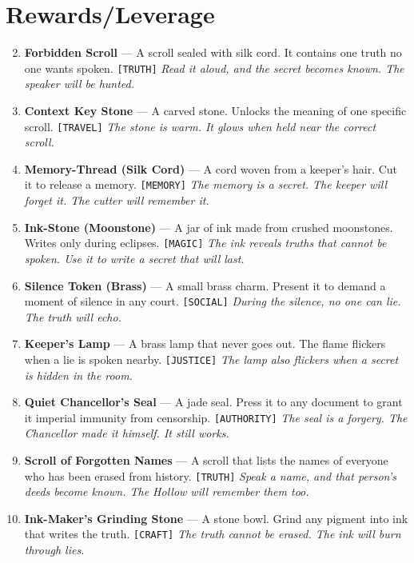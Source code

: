 \section*{ Rewards/Leverage}
\label{sec:lethai-thora-rewards}
\begin{enumerate}
\setcounter{enumi}{1}
\item \textbf{Forbidden Scroll} --- A scroll sealed with silk cord. It contains one truth no one wants spoken. \texttt{[TRUTH]}
  \hfill \textit{Read it aloud, and the secret becomes known. The speaker will be hunted.}
\item \textbf{Context Key Stone} --- A carved stone. Unlocks the meaning of one specific scroll. \texttt{[TRAVEL]}
  \hfill \textit{The stone is warm. It glows when held near the correct scroll.}
\item \textbf{Memory-Thread (Silk Cord)} --- A cord woven from a keeper's hair. Cut it to release a memory. \texttt{[MEMORY]}
  \hfill \textit{The memory is a secret. The keeper will forget it. The cutter will remember it.}
\item \textbf{Ink-Stone (Moonstone)} --- A jar of ink made from crushed moonstones. Writes only during eclipses. \texttt{[MAGIC]}
  \hfill \textit{The ink reveals truths that cannot be spoken. Use it to write a secret that will last.}
\item \textbf{Silence Token (Brass)} --- A small brass charm. Present it to demand a moment of silence in any court. \texttt{[SOCIAL]}
  \hfill \textit{During the silence, no one can lie. The truth will echo.}
\item \textbf{Keeper's Lamp} --- A brass lamp that never goes out. The flame flickers when a lie is spoken nearby. \texttt{[JUSTICE]}
  \hfill \textit{The lamp also flickers when a secret is hidden in the room.}
\item \textbf{Quiet Chancellor's Seal} --- A jade seal. Press it to any document to grant it imperial immunity from censorship. \texttt{[AUTHORITY]}
  \hfill \textit{The seal is a forgery. The Chancellor made it himself. It still works.}
\item \textbf{Scroll of Forgotten Names} --- A scroll that lists the names of everyone who has been erased from history. \texttt{[TRUTH]}
  \hfill \textit{Speak a name, and that person's deeds become known. The Hollow will remember them too.}
\item \textbf{Ink-Maker's Grinding Stone} --- A stone bowl. Grind any pigment into ink that writes the truth. \texttt{[CRAFT]}
  \hfill \textit{The truth cannot be erased. The ink will burn through lies.}

\end{enumerate}
